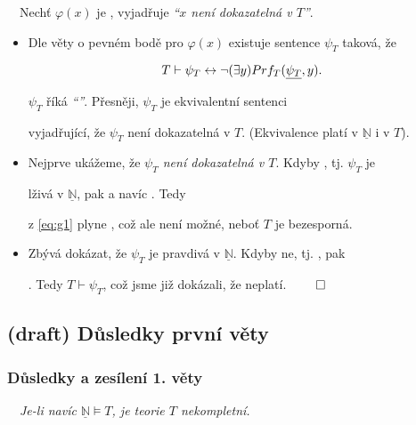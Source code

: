     \smallskip
    
    \ \ Nechť $\varphi(x)$ je , vyjadřuje {\it ``$x$ není dokazatelná v $T$''}.
    
    \begin{itemize}
    \item Dle věty o pevném bodě pro $\varphi(x)$ existuje sentence $\psi_T$ taková, že
    
    \begin{equation}\label{eq:g1}
    {T\vdash \psi_T \leftrightarrow \neg (\exists y)Prf_T(\underline{\psi_T},y)}.
    \end{equation}
    
    
    $\psi_T$ říká {\it ``''}. Přesněji,  $\psi_T$ je ekvivalentní sentenci
    \smallskip
    
    vyjadřující, že $\psi_T$ není dokazatelná v $T$. (Ekvivalence platí v $\underline{\mathbb{N}}$ i v $T$).
    \smallskip
    
    \item Nejprve ukážeme, že {\it $\psi_T$ není dokazatelná v $T$}. Kdyby , tj. $\psi_T$ je
    \smallskip
    
    lživá v $\underline{\mathbb{N}}$, pak  a navíc
    . Tedy
    \smallskip
    
    z \eqref{eq:g1} plyne , což ale není možné, neboť $T$ je bezesporná.
    \smallskip
    
    \item Zbývá dokázat, že $\psi_T$ je pravdivá v $\underline{\mathbb{N}}$. Kdyby ne, tj. , pak
    \smallskip
    
    . Tedy $T \vdash \psi_T$, což jsme již dokázali, že neplatí. $\qed$
    \end{itemize}
    



\subsection{(draft) Důsledky první věty}\todo

\subsubsection*{Důsledky a zesílení 1. věty}
    \ \ {\it Je-li navíc $\underline{\mathbb{N}}\models T$, je teorie $T$ nekompletní.}
    \medskip
    
